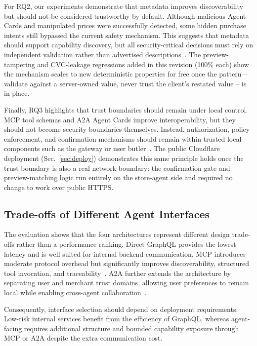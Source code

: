 \documentclass[conference]{IEEEtran}
\begin{document}
For RQ2, our experiments demonstrate that metadata improves discoverability
but should not be considered trustworthy by default. Although malicious
Agent Cards and manipulated prices were successfully detected, some hidden
purchase intents still bypassed the current safety mechanism. This suggests
that metadata should support capability discovery, but all security-critical
decisions must rely on independent validation rather than advertised
descriptions~\cite{ref5,ref6}. The preview-tampering and CVC-leakage
regressions added in this revision (100\% each) show the mechanism scales to
new deterministic properties for free once the pattern -- validate against a
server-owned value, never trust the client's restated value -- is in place.

Finally, RQ3 highlights that trust boundaries should remain under local
control. MCP tool schemas and A2A Agent Cards improve interoperability, but
they should not become security boundaries themselves. Instead, authorization,
policy enforcement, and confirmation mechanisms should remain within trusted
local components such as the gateway or user butler~\cite{ref3,ref5}. The
public Cloudflare deployment (Sec.~\ref{sec:deploy}) demonstrates this same
principle holds once the trust boundary is also a real network boundary: the
confirmation gate and preview-matching logic run entirely on the store-agent
side and required no change to work over public HTTPS.

\subsection{Trade-offs of Different Agent Interfaces}

The evaluation shows that the four architectures represent different design
trade-offs rather than a performance ranking. Direct GraphQL provides the
lowest latency and is well suited for internal backend communication. MCP
introduces moderate protocol overhead but significantly improves
discoverability, structured tool invocation, and traceability~\cite{ref2,ref9}.
A2A further extends the architecture by separating user and merchant trust
domains, allowing user preferences to remain local while enabling cross-agent
collaboration~\cite{ref3}.

Consequently, interface selection should depend on deployment requirements.
Low-risk internal services benefit from the efficiency of GraphQL, whereas
agent-facing requires additional structure and bounded capability exposure
through MCP or A2A despite the extra communication cost.
\end{document}
